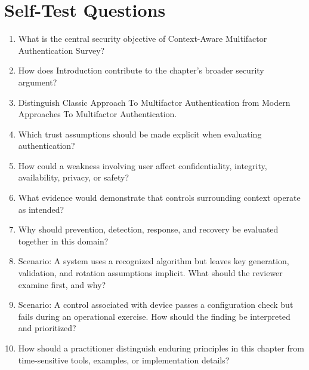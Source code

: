 \documentclass[11pt]{article}
\begin{document}
\section*{Self-Test Questions}
\begin{enumerate}
\item What is the central security objective of Context-Aware Multifactor Authentication Survey?
\item How does Introduction contribute to the chapter's broader security argument?
\item Distinguish Classic Approach To Multifactor Authentication from Modern Approaches To Multifactor Authentication.
\item Which trust assumptions should be made explicit when evaluating authentication?
\item How could a weakness involving user affect confidentiality, integrity, availability, privacy, or safety?
\item What evidence would demonstrate that controls surrounding context operate as intended?
\item Why should prevention, detection, response, and recovery be evaluated together in this domain?
\item Scenario: A system uses a recognized algorithm but leaves key generation, validation, and rotation assumptions implicit. What should the reviewer examine first, and why?
\item Scenario: A control associated with device passes a configuration check but fails during an operational exercise. How should the finding be interpreted and prioritized?
\item How should a practitioner distinguish enduring principles in this chapter from time-sensitive tools, examples, or implementation details?
\end{enumerate}
\end{document}

